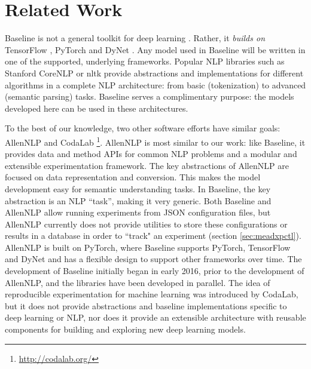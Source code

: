 \documentclass[11pt,a4paper]{article}
\begin{document}
\section{Related Work}
\label{sec:relatedwork}

Baseline is not a general toolkit for deep learning \cite{Bergstra2011TheanoAC:11, Abadi2016TensorFlowAS:16, chen2015mxnet:15, Neubig2017DyNetTD:17, Paszke2017AutomaticDI:17}. Rather, it \textit{builds on} TensorFlow \cite{Abadi2016TensorFlowAS:16}, PyTorch \cite{Paszke2017AutomaticDI:17} and DyNet \cite{DBLP:journals/corr/NeubigDGMAABCCC17:17}. Any model used in Baseline will be written in one of the supported, underlying frameworks. Popular NLP libraries such as Stanford CoreNLP \cite{Manning2014TheSC:14} or nltk \cite{Loper:2002:NNL:1118108.1118117:02} provide abstractions and implementations for different algorithms in a complete NLP architecture: from basic (tokenization) to advanced (semantic parsing) tasks. Baseline serves a complimentary purpose: the models developed here can be used in these architectures. 

To the best of our knowledge, two other software efforts have similar goals: AllenNLP \cite{Gardner2017AllenNLPAD:17} and CodaLab \footnote{\url{http://codalab.org/}}. AllenNLP is most similar to our work: like Baseline, it provides data and method APIs for common NLP problems and a modular and extensible experimentation framework. The key abstractions of AllenNLP are focused on data representation and conversion. This makes the model development easy for semantic understanding tasks. In Baseline, the key abstraction is an NLP ``task'', making it very generic. Both Baseline and AllenNLP allow running experiments from JSON configuration files, but AllenNLP currently does not provide utilities to store these configurations or results in a database in order to ``track" an experiment (section \ref{sec:meadxpctl}). AllenNLP is built on PyTorch, where Baseline supports PyTorch, TensorFlow and DyNet and has a flexible design to support other frameworks over time. The development of Baseline initially began in early 2016, prior to the development of AllenNLP, and the libraries have been developed in parallel. The idea of reproducible experimentation for machine learning was introduced by CodaLab, but it does not provide abstractions and baseline implementations specific to deep learning or NLP, nor does it provide an extensible architecture with reusable components for building and exploring new deep learning models.  
\end{document}
